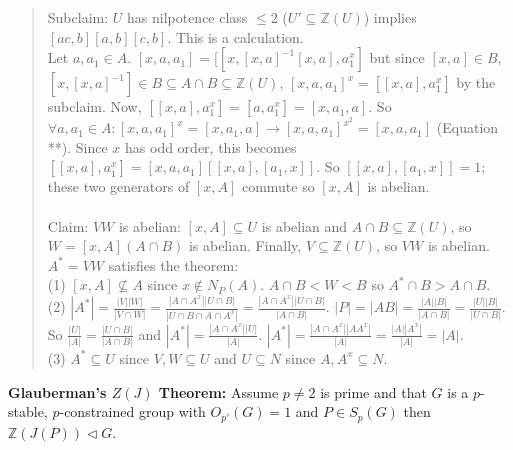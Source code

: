 \begin{quote}
Subclaim: $U$ has nilpotence class $\le 2$ ($U' \subseteq {\mathbb Z}(U)$) implies
$[ac,b] [a,b][c,b]$.  This is a calculation.\\
Let $a, a_1 \in A$.  $[x,a,a_1]= [[x, [x,a]^{-1} [x,a], a_1^x]$ but since $[x,a] \in B$,
$[x, [x,a]^{-1}] \in B \subseteq A \cap B \subseteq {\mathbb Z}(U)$,
$[x,a,a_1]^x = [[x,a],a_1^x]$ by the subclaim.
Now, $[[x,a],a_1^x]= [a,a_1^x]= [x,a_1,a]$.
So $\forall a, a_1 \in A: [x,a,a_1]^x=[x,a_1,a] \rightarrow [x,a,a_1]^{x^2}=[x,a,a_1]$ 
(Equation **).  Since $x$ has odd order, this becomes $[[x,a],a_1^x]= [x,a,a_1][[x,a],[a_1,x]]$.
So $[[x,a],[a_1,x]]=1$; these two generators of $[x,A]$ commute so $[x,A]$ is abelian.
\\
\\
Claim: $VW$ is abelian: $[x,A] \subseteq U$ is abelian and $A \cap B \subseteq {\mathbb Z}(U)$,
so $W= [x,A] (A \cap B)$ is abelian.  Finally, $V \subseteq {\mathbb Z}(U)$, so $VW$ is
abelian.
\\
$A^*=VW$ satisfies the theorem:\\
(1) $[x,A] \nsubseteq A$ since $x \notin N_P(A)$.
$A \cap B < W <B$ so $A^* \cap B > A \cap B$.\\
(2) $|A^*|= 
{\frac {|V| |W|} {|V \cap W|}} =
{\frac {|A \cap A^x| |U \cap B|} {|U \cap B \cap A \cap A^x|}} =
{\frac {|A \cap A^x| |U \cap B|} {|A \cap B|}}$.
$|P|=|AB|=
{\frac {|A| |B|} {|A \cap B|}} =
{\frac {|U| |B|} {|U \cap B|}}$.  So
$
{\frac {|U|} {|A|}}=
{\frac {|U \cap B|} {|A \cap B|}}$ and $|A^*|= {\frac {|A \cap A^x| |U|} {|A|}}$.
$|A^*| = {\frac {|A \cap A^x||A A^x|} {|A|}}= {\frac {|A| |A^x|} {|A|}}= |A|$.\\
(3)
$A^* \subseteq U$ since $V, W \subseteq U$ and $U \subseteq N$ since $A, A^x \subseteq N$.
\end{quote}
{\bf Glauberman's $Z(J)$ Theorem:}  Assume $p \ne 2$ is prime and that $G$ is a
$p$-stable, $p$-constrained group with $O_{p'}(G)=1$ and $P \in S_p(G)$ then
${\mathbb Z}(J(P)) \lhd G$.
